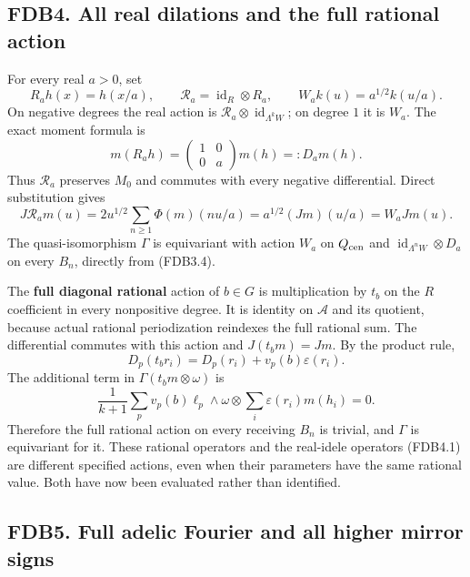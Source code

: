 \subsection{FDB4. All real dilations and the full rational
action}\label{fdb4.-all-real-dilations-and-the-full-rational-action}

For every real \(a>0\), set \[
R_a h(x)=h(x/a),\qquad \mathscr R_a=\operatorname{id}_R\otimes R_a,
\qquad W_a k(u)=a^{1/2}k(u/a).
\tag{FDB4.1}
\] On negative degrees the real action is
\(\mathscr R_a\otimes\operatorname{id}_{\Lambda^kW}\); on degree \(1\)
it is \(W_a\). The exact moment formula is \[
m(R_a h)=\begin{pmatrix}1&0\\0&a\end{pmatrix}m(h)=:D_a m(h).
\tag{FDB4.2}
\] Thus \(\mathscr R_a\) preserves \(M_0\) and commutes with every
negative differential. Direct substitution gives \[
J\mathscr R_a m(u)=2u^{1/2}\sum_{n\ge1}\Phi(m)(nu/a)
=a^{1/2}(Jm)(u/a)=W_aJm(u).
\tag{FDB4.3}
\] The quasi-isomorphism \(\Gamma\) is equivariant with action \(W_a\)
on \(Q_{\rm cen}\) and \(\operatorname{id}_{\Lambda^nW}\otimes D_a\) on
every \(B_n\), directly from (FDB3.4).

The \textbf{full diagonal rational} action of \(b\in G\) is
multiplication by \(t_b\) on the \(R\) coefficient in every nonpositive
degree. It is identity on \(\mathcal A\) and its quotient, because
actual rational periodization reindexes the full rational sum. The
differential commutes with this action and \(J(t_bm)=Jm\). By the
product rule, \[
D_p(t_b r_i)=D_p(r_i)+v_p(b)\varepsilon(r_i).
\] The additional term in \(\Gamma(t_bm\otimes\omega)\) is \[
\frac1{k+1}\sum_pv_p(b)\ell_p\wedge\omega
\otimes\sum_i\varepsilon(r_i)m(h_i)=0.
\tag{FDB4.4}
\] Therefore the full rational action on every receiving \(B_n\) is
trivial, and \(\Gamma\) is equivariant for it. These rational operators
and the real-idele operators (FDB4.1) are different specified actions,
even when their parameters have the same rational value. Both have now
been evaluated rather than identified.

\subsection{FDB5. Full adelic Fourier and all higher mirror
signs}\label{fdb5.-full-adelic-fourier-and-all-higher-mirror-signs}

